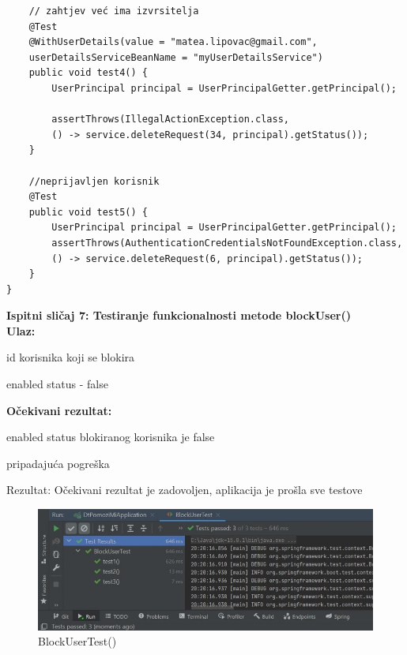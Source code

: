 \begin{verbatim}
	// zahtjev već ima izvrsitelja
	@Test
	@WithUserDetails(value = "matea.lipovac@gmail.com",
	userDetailsServiceBeanName = "myUserDetailsService")
	public void test4() {
		UserPrincipal principal = UserPrincipalGetter.getPrincipal();

		assertThrows(IllegalActionException.class, 
		() -> service.deleteRequest(34, principal).getStatus());
	}

	//neprijavljen korisnik
	@Test
	public void test5() {
		UserPrincipal principal = UserPrincipalGetter.getPrincipal();
		assertThrows(AuthenticationCredentialsNotFoundException.class, 
		() -> service.deleteRequest(6, principal).getStatus());
	}
}
            \end{verbatim}
            
            \medskip
			
			\noindent \textbf{Ispitni sličaj 7: Testiranje funkcionalnosti metode blockUser()}\\
			
			\medskip
            \noindent\textbf{Ulaz:}
            \begin{packed_enum}
            \item id korisnika koji se blokira
            \item enabled status - false
            \end{packed_enum}
            
            \noindent\textbf{Očekivani rezultat:}
            \begin{packed_enum}
            \item enabled status blokiranog korisnika je false
            \item pripadajuća pogreška
            \end{packed_enum}
            
            \noindent \text
            Rezultat: Očekivani rezultat je zadovoljen, aplikacija je prošla sve testove \\
            
            \begin{figure}[H]
                 \includegraphics[width=\textwidth, height=\textheight, keepaspectratio]{slike/BlockUserTest.jpeg}
                \centering
                \caption{BlockUserTest()}
            \end{figure}
            
